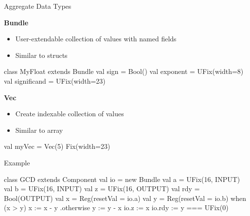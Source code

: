 \documentclass[xcolor=pdflatex,dvipsnames,table]{beamer}
\begin{document}
\begin{frame}[fragile]{Aggregate Data Types}

\textbf{Bundle}

\begin{itemize}
\item User-extendable collection of values with named fields
\item Similar to structs
\end{itemize}

\begin{footnotesize}
\begin{scala}
class MyFloat extends Bundle{
  val sign        = Bool()
  val exponent    = UFix(width=8)
  val significand = UFix(width=23)
}
\end{scala}
\end{footnotesize}

\textbf{Vec}

\begin{itemize}
\item Create indexable collection of values
\item Similar to array
\end{itemize}

\begin{footnotesize}
\begin{scala}
val myVec = Vec(5){ Fix(width=23) }
\end{scala}
\end{footnotesize}

\end{frame}

\begin{frame}[fragile]{Example}
\begin{footnotesize}
\begin{scala}
class GCD extends Component {
  val io = new Bundle {
    val a   = UFix(16, INPUT)
    val b   = UFix(16, INPUT)
    val z   = UFix(16, OUTPUT)
    val rdy = Bool(OUTPUT) }
  val x  = Reg(resetVal = io.a)
  val y  = Reg(resetVal = io.b)
  when (x > y) {
    x := x - y
  } .otherwise {
    y := y - x
  }
  io.z   := x
  io.rdy := y === UFix(0)
}
\end{scala}
\end{footnotesize}
\end{frame}
\end{document}
